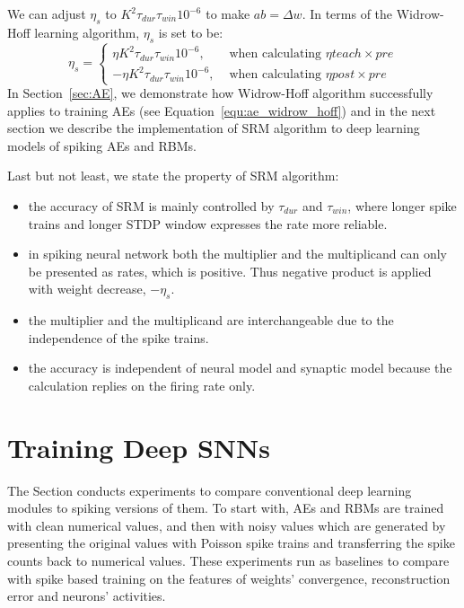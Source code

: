 We can adjust $\eta_s$ to $ K^2 \tau_{dur} \tau_{win}10^{-6}$ to make $ab = \Delta w$.
In terms of the Widrow-Hoff learning algorithm, $\eta_s$ is set to be:
\begin{equation}
	\eta_s=
    \left\{
    \begin{aligned} 
    \eta K^2 \tau_{dur} \tau_{win}10^{-6}, &\text{ when calculating } \eta teach \times pre\\
    - \eta K^2 \tau_{dur} \tau_{win}10^{-6}, &\text{ when calculating } \eta post \times pre
    \end{aligned}
    \right.
\end{equation}
In Section~\ref{sec:AE}, we demonstrate how Widrow-Hoff algorithm successfully applies to training AEs (see Equation~\ref{equ:ae_widrow_hoff}) and in the next section we describe the implementation of SRM algorithm to deep learning models of spiking AEs and RBMs.

Last but not least, we state the property of SRM algorithm:
\begin{itemize}
	\item the accuracy of SRM is mainly controlled by $\tau_{dur}$ and $\tau_{win}$, where longer spike trains and longer STDP window expresses the rate more reliable.
	\item in spiking neural network both the multiplier and the multiplicand can only be presented as rates, which is positive.
	Thus negative product is applied with weight decrease, $-\eta_s$. 
	\item the multiplier and the multiplicand are interchangeable due to the independence of the spike trains. 
	\item the accuracy is independent of neural model and synaptic model because the calculation replies on the firing rate only.
\end{itemize}
\section{Training Deep SNNs}
\label{sec:dSNN}
The Section conducts experiments to compare conventional deep learning modules to spiking versions of them.
To start with, AEs and RBMs are trained with clean numerical values, and then with noisy values which are generated by presenting the original values with Poisson spike trains and transferring the spike counts back to numerical values.
These experiments run as baselines to compare with spike based training on the features of weights' convergence, reconstruction error and neurons' activities.

